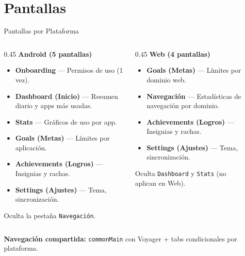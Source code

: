 \documentclass[aspectratio=169]{beamer}
\begin{document}
\section{Pantallas}
\begin{frame}{Pantallas por Plataforma}
  \begin{columns}[T]
    \begin{column}{0.45\textwidth}
      \centering\textbf{\textcolor{purpleprimary}{Android (5 pantallas)}}\\[0.2cm]
      \begin{itemize}
        \item \textbf{Onboarding} --- Permisos de uso (1 vez).
        \item \textbf{Dashboard (Inicio)} --- Resumen diario y apps m\'as usadas.
        \item \textbf{Stats} --- Gr\'aficos de uso por app.
        \item \textbf{Goals (Metas)} --- L\'imites por aplicaci\'on.
        \item \textbf{Achievements (Logros)} --- Insignias y rachas.
        \item \textbf{Settings (Ajustes)} --- Tema, sincronizaci\'on.
      \end{itemize}
      Oculta la pesta\~na \texttt{Navegaci\'on}.
    \end{column}
    \begin{column}{0.45\textwidth}
      \centering\textbf{\textcolor{orangeprimary}{Web (4 pantallas)}}\\[0.2cm]
      \begin{itemize}
        \item \textbf{Goals (Metas)} --- L\'imites por dominio web.
        \item \textbf{Navegaci\'on} --- Estad\'isticas de navegaci\'on por dominio.
        \item \textbf{Achievements (Logros)} --- Insignias y rachas.
        \item \textbf{Settings (Ajustes)} --- Tema, sincronizaci\'on.
      \end{itemize}
      Oculta \texttt{Dashboard} y \texttt{Stats} (no aplican en Web).
    \end{column}
  \end{columns}

  \vspace{0.3cm}
  \centering
  \textbf{Navegaci\'on compartida:} \texttt{commonMain} con Voyager + tabs condicionales por plataforma.
\end{frame}
\end{document}
